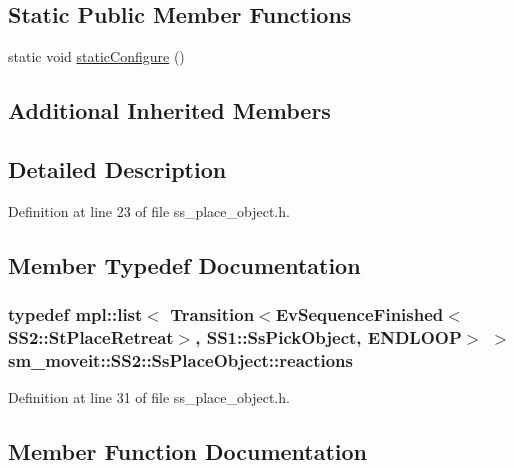 \subsection*{Static Public Member Functions}
\begin{DoxyCompactItemize}
\item 
static void \hyperlink{structsm__moveit_1_1SS2_1_1SsPlaceObject_a3b82d494fc8511de679c4d1dc8bd71e2}{static\+Configure} ()
\end{DoxyCompactItemize}
\subsection*{Additional Inherited Members}


\subsection{Detailed Description}


Definition at line 23 of file ss\+\_\+place\+\_\+object.\+h.



\subsection{Member Typedef Documentation}
\subsubsection[{\texorpdfstring{reactions}{reactions}}]{\setlength{\rightskip}{0pt plus 5cm}typedef mpl\+::list$<$ Transition$<$Ev\+Sequence\+Finished$<$S\+S2\+::\+St\+Place\+Retreat$>$, {\bf S\+S1\+::\+Ss\+Pick\+Object}, E\+N\+D\+L\+O\+OP$>$ $>$ {\bf sm\+\_\+moveit\+::\+S\+S2\+::\+Ss\+Place\+Object\+::reactions}}\hypertarget{structsm__moveit_1_1SS2_1_1SsPlaceObject_aca741dbdbd329a6f6bc8327f16c45c8c}{}\label{structsm__moveit_1_1SS2_1_1SsPlaceObject_aca741dbdbd329a6f6bc8327f16c45c8c}


Definition at line 31 of file ss\+\_\+place\+\_\+object.\+h.



\subsection{Member Function Documentation}

